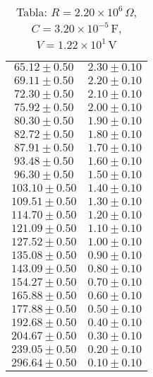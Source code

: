 \begin{table}[H]
\begin{tabular}{|c|c|}
$65.12 \pm 0.50$ & $2.30 \pm 0.10$ \\
$69.11 \pm 0.50$ & $2.20 \pm 0.10$ \\
$72.30 \pm 0.50$ & $2.10 \pm 0.10$ \\
$75.92 \pm 0.50$ & $2.00 \pm 0.10$ \\
$80.30 \pm 0.50$ & $1.90 \pm 0.10$ \\
$82.72 \pm 0.50$ & $1.80 \pm 0.10$ \\
$87.91 \pm 0.50$ & $1.70 \pm 0.10$ \\
$93.48 \pm 0.50$ & $1.60 \pm 0.10$ \\
$96.30 \pm 0.50$ & $1.50 \pm 0.10$ \\
$103.10 \pm 0.50$ & $1.40 \pm 0.10$ \\
$109.51 \pm 0.50$ & $1.30 \pm 0.10$ \\
$114.70 \pm 0.50$ & $1.20 \pm 0.10$ \\
$121.09 \pm 0.50$ & $1.10 \pm 0.10$ \\
$127.52 \pm 0.50$ & $1.00 \pm 0.10$ \\
$135.08 \pm 0.50$ & $0.90 \pm 0.10$ \\
$143.09 \pm 0.50$ & $0.80 \pm 0.10$ \\
$154.27 \pm 0.50$ & $0.70 \pm 0.10$ \\
$165.88 \pm 0.50$ & $0.60 \pm 0.10$ \\
$177.88 \pm 0.50$ & $0.50 \pm 0.10$ \\
$192.68 \pm 0.50$ & $0.40 \pm 0.10$ \\
$204.67 \pm 0.50$ & $0.30 \pm 0.10$ \\
$239.05 \pm 0.50$ & $0.20 \pm 0.10$ \\
$296.64 \pm 0.50$ & $0.10 \pm 0.10$ \\
\hline
\end{tabular}
\caption*{Tabla: $R = 2.20 \times 10^{6}\,\Omega$, $C = 3.20 \times 10^{-5}$\,F, $V = 1.22 \times 10^{1}$\,V}
\end{table}
